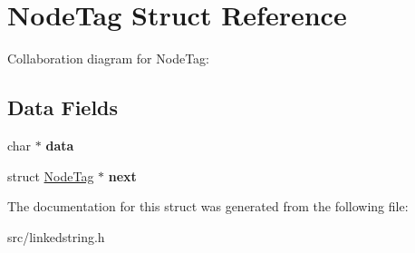 \hypertarget{structNodeTag}{}\section{Node\+Tag Struct Reference}
\label{structNodeTag}


Collaboration diagram for Node\+Tag\+:
\subsection*{Data Fields}
\begin{DoxyCompactItemize}
\item 
\mbox{\label{structNodeTag_a9d4dc555b35a55a66dd74e68883b6edb}} 
char $\ast$ {\bfseries data}
\item 
\mbox{\label{structNodeTag_ab7ff9c5937d69d117fb8b55024567ff7}} 
struct \hyperlink{structNodeTag}{Node\+Tag} $\ast$ {\bfseries next}
\end{DoxyCompactItemize}


The documentation for this struct was generated from the following file\+:\begin{DoxyCompactItemize}
\item 
src/linkedstring.\+h\end{DoxyCompactItemize}

